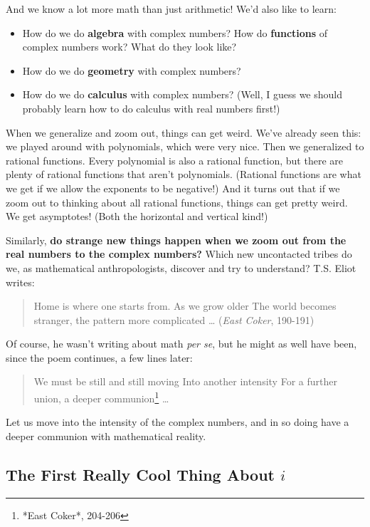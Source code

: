 \documentclass[
]{article}
\providecommand{\tightlist}{%
  \setlength{\itemsep}{0pt}\setlength{\parskip}{0pt}}
\begin{document}
And we know a lot more math than just arithmetic! We'd also like to
learn:

\begin{itemize}
\tightlist
\item
  How do we do \textbf{algebra} with complex numbers? How do
  \textbf{functions} of complex numbers work? What do they look like?
\item
  How do we do \textbf{geometry} with complex numbers?
\item
  How do we do \textbf{calculus} with complex numbers? (Well, I guess we
  should probably learn how to do calculus with real numbers first!)
\end{itemize}

When we generalize and zoom out, things can get weird. We've already
seen this: we played around with polynomials, which were very nice. Then
we generalized to rational functions. Every polynomial is also a
rational function, but there are plenty of rational functions that
aren't polynomials. (Rational functions are what we get if we allow the
exponents to be negative!) And it turns out that if we zoom out to
thinking about all rational functions, things can get pretty weird. We
get asymptotes! (Both the horizontal and vertical kind!)

Similarly, \textbf{do strange new things happen when we zoom out from
the real numbers to the complex numbers?} Which new uncontacted tribes
do we, as mathematical anthropologists, discover and try to understand?
T.S. Eliot writes:

\begin{quote}
Home is where one starts from. As we grow older The world becomes
stranger, the pattern more complicated \ldots{} (\emph{East Coker},
190-191)
\end{quote}

Of course, he wasn't writing about math \emph{per se}, but he might as
well have been, since the poem continues, a few lines later:

\begin{quote}
We must be still and still moving Into another intensity For a further
union, a deeper communion\footnote{ *East Coker*, 204-206} \ldots{}
\end{quote}

Let us move into the intensity of the complex numbers, and in so doing
have a deeper communion with mathematical reality.

\hypertarget{the-first-really-cool-thing-about-i}{%
\subsection{\texorpdfstring{The First Really Cool Thing About
\(i\)}{The First Really Cool Thing About i}}\label{the-first-really-cool-thing-about-i}}
\end{document}
